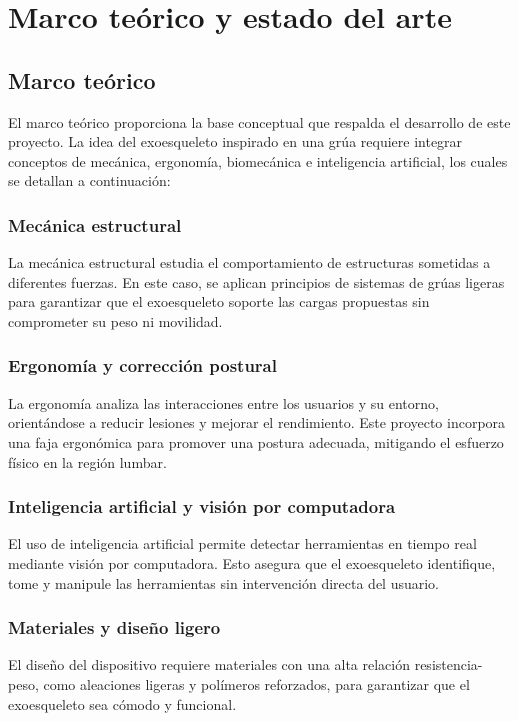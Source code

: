 \chapter{Marco teórico y estado del arte}

\section{Marco teórico}
El marco teórico proporciona la base conceptual que respalda el desarrollo de este proyecto. La idea del exoesqueleto inspirado en una grúa requiere integrar conceptos de mecánica, ergonomía, biomecánica e inteligencia artificial, los cuales se detallan a continuación:

\subsection{Mecánica estructural}
La mecánica estructural estudia el comportamiento de estructuras sometidas a diferentes fuerzas. En este caso, se aplican principios de sistemas de grúas ligeras para garantizar que el exoesqueleto soporte las cargas propuestas sin comprometer su peso ni movilidad.

\subsection{Ergonomía y corrección postural}
La ergonomía analiza las interacciones entre los usuarios y su entorno, orientándose a reducir lesiones y mejorar el rendimiento. Este proyecto incorpora una faja ergonómica para promover una postura adecuada, mitigando el esfuerzo físico en la región lumbar.

\subsection{Inteligencia artificial y visión por computadora}
El uso de inteligencia artificial permite detectar herramientas en tiempo real mediante visión por computadora. Esto asegura que el exoesqueleto identifique, tome y manipule las herramientas sin intervención directa del usuario.

\subsection{Materiales y diseño ligero}
El diseño del dispositivo requiere materiales con una alta relación resistencia-peso, como aleaciones ligeras y polímeros reforzados, para garantizar que el exoesqueleto sea cómodo y funcional.

